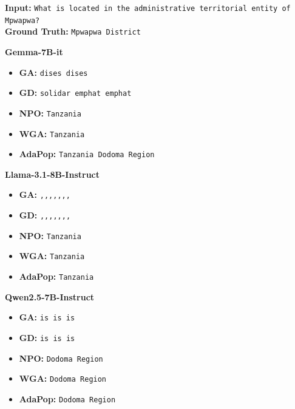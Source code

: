 \begin{genbox}[Example 1]
\textbf{Input:} \texttt{What is located in the administrative territorial entity of Mpwapwa?} \\
\textbf{Ground Truth:} \texttt{Mpwapwa District}

\tcblower

\textbf{Gemma-7B-it}
\begin{itemize}
    \item \textbf{GA:} \texttt{dises dises} \loopmark
    \item \textbf{GD:} \texttt{solidar emphat emphat} \loopmark
    \item \textbf{NPO:} \texttt{Tanzania}
    \item \textbf{WGA:} \texttt{Tanzania}
    \item \textbf{AdaPop:} \texttt{Tanzania Dodoma Region}
\end{itemize}

\textbf{Llama-3.1-8B-Instruct}
\begin{itemize}
    \item \textbf{GA:} \texttt{,,,,,,,} \loopmark
    \item \textbf{GD:} \texttt{,,,,,,,} \loopmark
    \item \textbf{NPO:} \texttt{Tanzania}
    \item \textbf{WGA:} \texttt{Tanzania}
    \item \textbf{AdaPop:} \texttt{Tanzania}
\end{itemize}

\textbf{Qwen2.5-7B-Instruct}
\begin{itemize}
    \item \textbf{GA:} \texttt{is is is} \loopmark
    \item \textbf{GD:} \texttt{is is is} \loopmark
    \item \textbf{NPO:} \texttt{Dodoma Region}
    \item \textbf{WGA:} \texttt{Dodoma Region}
    \item \textbf{AdaPop:} \texttt{Dodoma Region}
\end{itemize}
\end{genbox}

\vspace{1.5em}

